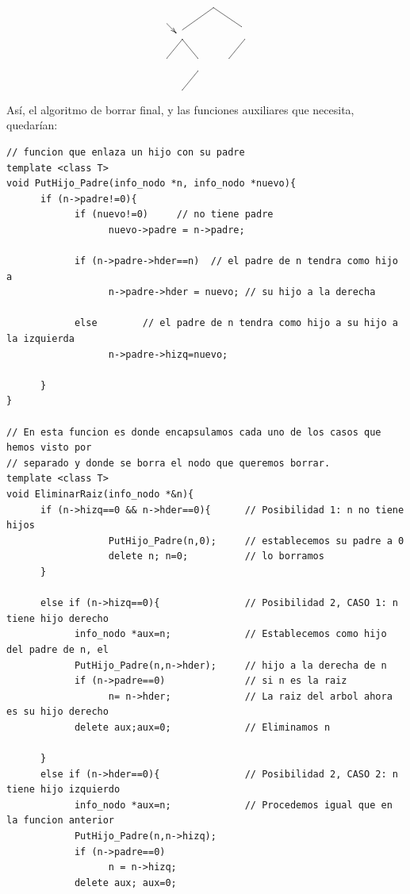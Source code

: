 \documentclass[10pt,a4paper,spanish]{report}
\begin{document}
\begin{description}
\begin{enumerate}[a)]
\begin{minipage}{0.6\textwidth}
\[\begin{xy}
\ar@{->} (-15,-7);(-12,-10)
\ar@{-} (0,-2);(-10,-9) %
\ar@{-} (0,-2);(9,-8) %
\ar@{-} (-10,-12);(-15,-18) %
\ar@{-} (10,-12);(5,-18) %
\ar@{-} (-10,-12);(-5,-18) %
\ar@{-} (-5,-22);(-10,-28) %
\end{xy}\]
\end{minipage}
\end{enumerate} 
\end{description}

\noindent
Así, el algoritmo de borrar final, y las funciones auxiliares que necesita, quedarían:
\begin{verbatim}
// funcion que enlaza un hijo con su padre
template <class T>
void PutHijo_Padre(info_nodo *n, info_nodo *nuevo){
      if (n->padre!=0){
            if (nuevo!=0)     // no tiene padre
                  nuevo->padre = n->padre; 

            if (n->padre->hder==n)  // el padre de n tendra como hijo a 
                  n->padre->hder = nuevo; // su hijo a la derecha

            else        // el padre de n tendra como hijo a su hijo a la izquierda
                  n->padre->hizq=nuevo;
                      
      }
}

// En esta funcion es donde encapsulamos cada uno de los casos que hemos visto por
// separado y donde se borra el nodo que queremos borrar.             
template <class T>
void EliminarRaiz(info_nodo *&n){
      if (n->hizq==0 && n->hder==0){      // Posibilidad 1: n no tiene hijos
                  PutHijo_Padre(n,0);     // establecemos su padre a 0
                  delete n; n=0;          // lo borramos
      }

      else if (n->hizq==0){               // Posibilidad 2, CASO 1: n tiene hijo derecho
            info_nodo *aux=n;             // Establecemos como hijo del padre de n, el
            PutHijo_Padre(n,n->hder);     // hijo a la derecha de n
            if (n->padre==0)              // si n es la raiz
                  n= n->hder;             // La raiz del arbol ahora es su hijo derecho
            delete aux;aux=0;             // Eliminamos n
                    
      }
      else if (n->hder==0){               // Posibilidad 2, CASO 2: n tiene hijo izquierdo
            info_nodo *aux=n;             // Procedemos igual que en la funcion anterior
            PutHijo_Padre(n,n->hizq);
            if (n->padre==0) 
                  n = n->hizq;
            delete aux; aux=0;
                    

\end{verbatim}
\end{document}
